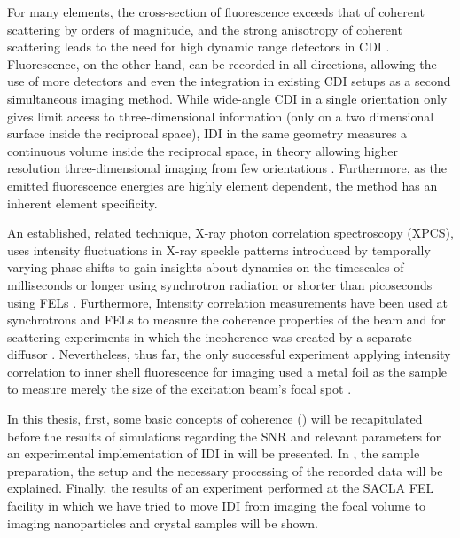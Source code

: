 For many elements, the cross-section of fluorescence exceeds that of coherent scattering by orders of magnitude, and the strong anisotropy of coherent scattering leads to the need for high dynamic range detectors in CDI \cite{xraylib,attwood1999}.  Fluorescence, on the other hand, can be recorded in all directions, allowing the use of more detectors and even the integration in existing CDI setups as a second simultaneous imaging method. While wide-angle CDI in a single orientation only gives limit access to three-dimensional information  (only on a two dimensional surface inside the reciprocal space), IDI in the same geometry measures a continuous volume inside the reciprocal space, in theory allowing higher resolution three-dimensional imaging from few orientations \cite{barke2015,classen2017}. Furthermore, as the emitted fluorescence energies are highly element dependent, the method has an inherent element specificity.

An established, related technique, X-ray photon correlation spectroscopy (XPCS), uses intensity fluctuations in X-ray speckle patterns introduced by temporally varying phase shifts to gain insights about dynamics on the timescales of milliseconds or longer using synchrotron radiation or shorter than picoseconds using FELs \cite{lehmkuhler2021,grubel2007}. Furthermore, Intensity correlation measurements have been used at synchrotrons and FELs to measure the coherence properties of the beam and for scattering experiments in which the incoherence was created by a separate diffusor \cite{yabashi2002,singer2013,inoue2019,gorobtsov2018,schneider2018}.  Nevertheless, thus far, the only successful experiment applying intensity correlation to inner shell fluorescence for imaging used a metal foil as the sample to measure merely the size of the excitation beam's focal spot \cite{nakumura2020}.

In this thesis, first, some basic concepts of coherence () will be recapitulated before the results of simulations regarding the SNR and relevant parameters for an experimental implementation of IDI in  will be presented. In , the sample preparation, the setup and the necessary processing of the recorded data will be explained. Finally, the results of an experiment performed at the SACLA FEL facility in which we have tried to move IDI from imaging the focal volume to imaging nanoparticles and crystal samples will be shown.

\cleardoublepage
